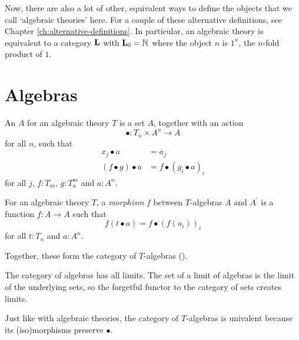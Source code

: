 Now, there are also a lot of other, equivalent ways to define the objects that we call `algebraic theories' here. For a couple of these alternative definitions, see Chapter \ref{ch:alternative-definitions}. In particular, an algebraic theory is equivalent to a category $ \mathbf{L} $ with $ \mathbf{L}_0 = \mathbb N $ where the object $ n $ is $ 1^n $, the $ n $-fold product of $ 1 $.

\section{Algebras}\label{sec:algebras}

\begin{definition}
  An  $ A $ for an algebraic theory $ T $ is a set $ A $, together with an action
  \[ \bullet: T_n \times A^n \to A \]
  for all $ n $, such that
  \begin{align*}
    x_j \bullet a &= a_j\\
    (f \bullet g) \bullet a &= f \bullet (g_i \bullet a)_i
  \end{align*}
  for all $ j $, $ f: T_m $, $ g: T_n^m $ and $ a: A^n $.
\end{definition}

\begin{definition}
  For an algebraic theory $ T $, a \textit{morphism} $ f $ between $ T $-algebras $ A $ and $ A^\prime $ is a function $ f: A \to A $ such that
  \[ f(t \bullet a) = f \bullet (f(a_i))_i \]
  for all $ t: T_n $ and $ a: A^n $.
\end{definition}

Together, these form the category of $ T $-algebras  ().

\begin{remark}
  The category of algebras has all limits. The set of a limit of algebras is the limit of the underlying sets, so the forgetful functor to the category of sets creates limits.
\end{remark}

\begin{lemma}
  Just like with algebraic theories, the category of $ T $-algebras is univalent because its (iso)morphisms preserve $ \bullet $.
\end{lemma}

